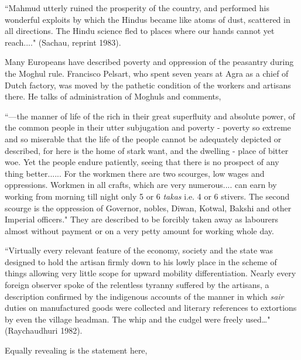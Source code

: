 ``Mahmud utterly ruined the prosperity of the country, and performed his wonderful exploits by which the Hindus became like atoms of dust, scattered in all directions. The Hindu science fled to places where our hands cannot yet reach...." (Sachau, reprint 1983).

Many Europeans have described poverty and oppression of the peasantry during the Moghul rule.  Francisco Pelsart, who spent seven years at Agra as a chief of Dutch factory, was moved by the pathetic condition of the workers and artisans there. He talks of administration of Moghuls and comments,

\vspace{.1cm}

``---the manner of life of the rich in their great superfluity and absolute power, of the common people in their utter subjugation and poverty - poverty so extreme and so miserable that the life of the people cannot be adequately depicted or described, for here is the home of stark want, and the dwelling - place of bitter woe.  Yet the people endure patiently, seeing that there is no prospect of any thing better......  For the workmen there are two scourges, low wages and oppressions.  Workmen in all crafts, which are very numerous.... can earn by working from morning till night only 5 or 6 {\it takas} i.e. 4 or 6 stivers.  The second scourge is the oppression of Governor, nobles, Diwan, Kotwal, Bakshi and other Imperial officers."  They are described to be forcibly taken away as labourers almost without payment or on a very petty amount for working whole day.

\vspace{.1cm}

``Virtually every relevant feature of the economy, society and the state was designed to hold the artisan firmly down to his lowly place in the scheme of things allowing very little scope for upward mobility differentiation. Nearly every foreign observer spoke of the relentless tyranny suffered by the artisans, a description confirmed by the indigenous accounts of the manner in which {\it sair} duties on manufactured goods were collected and literary references to extortions by even the village headman. The whip and the cudgel were freely used…" (Raychaudhuri 1982).

\vspace{.1cm}

Equally revealing is the statement here, 

\vspace{.1cm}

